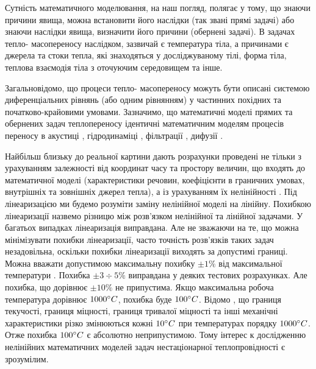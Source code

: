 Сутність математичного моделювання, на наш погляд, полягає у тому, що знаючи причини явища, можна встановити його
наслідки (так звані прямі задачі) або знаючи наслідки явища, визначити його причини (обернені задачі). В задачах тепло-
масопереносу наслідком, зазвичай є температура тіла, а причинами є джерела та стоки тепла, які знаходяться у
досліджуваному тілі, форма тіла, теплова взаємодія тіла з оточуючим середовищем та інше.

Загальновідомо, що процеси тепло- масопереносу можуть бути описані системою диференціальних рівнянь (або одним
рівнянням) у частинних похідних та початково-крайовими умовами. Зазначимо, що математичні моделі  прямих та обернених
задач теплопереносу  ідентичні математичним моделям процесів переносу в акустиці \cite{Zaharov-Inversnaya}, гідродинаміці \cite{Grekov-Opredelenie},
фільтрації \cite{Ahmedzyanova-IssledovanieSposobov}, дифузії \cite{Gamayunov-Metod}.

Найбільш близьку до реальної картини дають розрахунки проведені не тільки з урахуванням залежності від координат
часу та простору величин, що входять до математичної моделі (характеристики речовин, коефіцієнти в граничних умовах,
внутрішніх та зовнішніх джерел тепла), а із урахуванням їх нелінійності \cite{Kozdoba-Reshenie}. Під лінеаризацією ми будемо розуміти
заміну нелінійної моделі на лінійну.  Похибкою лінеаризації назвемо різницю між розв’язком нелінійної та лінійної
задачами. У багатьох випадках лінеаризація виправдана. Але не зважаючи на те, що можна мінімізувати похибки
лінеаризації, часто точність розв’язків таких задач незадовільна, оскільки похибки лінеаризації виходять за
допустимі границі. Можна вважати допустимою максимальну похибку $\pm1\% $ від максимальної температури \cite{Kozdoba-Reshenie}. Похибка $\pm3 \div 5\% $
виправдана у деяких тестових розрахунках. Але похибка, що дорівнює $\pm10\% $ не припустима. Якщо максимальна робоча
температура дорівнює $ 1000 \degree C $, похибка буде $ 100 \degree C $. Відомо \cite{Nayfe-Vvedenie}, що границя текучості, границя міцності, границя тривалої
міцності та інші механічні характеристики різко змінюються кожні $ 10 \degree C $ при температурах порядку $ 1000 \degree C $. Отже похибка $ 100 \degree C $ є
абсолютно неприпустимою. Тому інтерес к дослідженню нелінійних математичних моделей задач нестаціонарної
теплопровідності є зрозумілим.

